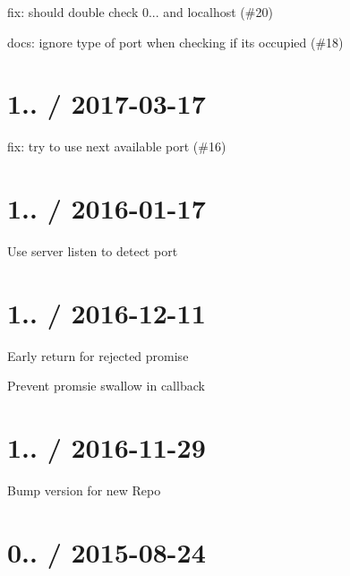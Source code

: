 
\begin{DoxyItemize}
\item fix\+: should double check 0... and localhost (\#20)
\item docs\+: ignore type of port when checking if it\textquotesingle{}s occupied (\#18)
\end{DoxyItemize}

\section*{1.. / 2017-\/03-\/17}


\begin{DoxyItemize}
\item fix\+: try to use next available port (\#16)
\end{DoxyItemize}

\section*{1.. / 2016-\/01-\/17}


\begin{DoxyItemize}
\item Use server listen to detect port
\end{DoxyItemize}

\section*{1.. / 2016-\/12-\/11}


\begin{DoxyItemize}
\item Early return for rejected promise
\item Prevent promsie swallow in callback
\end{DoxyItemize}

\section*{1.. / 2016-\/11-\/29}


\begin{DoxyItemize}
\item Bump version for new Repo
\end{DoxyItemize}

\section*{0.. / 2015-\/08-\/24}


